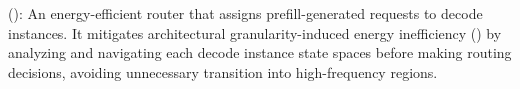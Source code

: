 \noindent
\textbf{\router} ():
An energy-efficient router that assigns prefill-generated requests to decode instances.
It mitigates architectural granularity-induced energy inefficiency () by analyzing and navigating each decode instance state spaces before making routing decisions, avoiding unnecessary transition into high-frequency regions.










